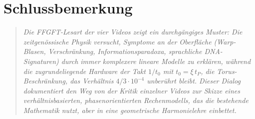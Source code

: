 \section*{Schlussbemerkung}

\begin{quote}
\itshape
Die FFGFT-Lesart der vier Videos zeigt ein durchg\"angiges Muster: Die zeitgen\"ossische Physik versucht, Symptome an der Oberfl\"ache (Warp-Blasen, Verschr\"ankung, Informationsparadoxa, sprachliche DNA-Signaturen) durch immer komplexere lineare Modelle zu erkl\"aren, w\"ahrend die zugrundeliegende Hardware \textendash{} der Takt $1/t_0$ mit $t_0 = \xi\,t_P$, die Torus-Beschr\"ankung, das Verh\"altnis $4/3 \cdot 10^{-4}$ \textendash{} unber\"uhrt bleibt. Dieser Dialog dokumentiert den Weg von der Kritik einzelner Videos zur Skizze eines verh\"altnisbasierten, phasenorientierten Rechenmodells, das die bestehende Mathematik nutzt, aber in eine geometrische Harmonielehre einbettet.
\end{quote}

